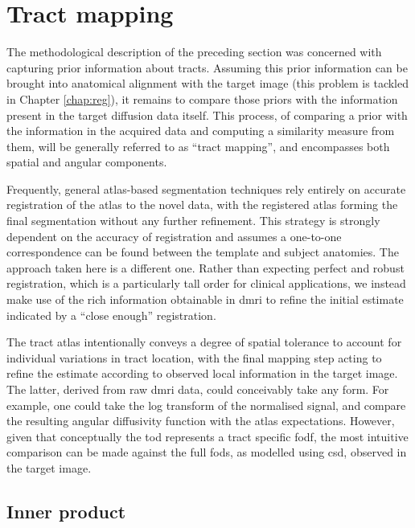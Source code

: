 \section{Tract mapping}
\label{sec:mapping}

The methodological description of the preceding section was concerned with capturing prior information about tracts.
Assuming this prior information can be brought into anatomical alignment with the target image (this problem is tackled in Chapter \ref{chap:reg}), it remains to compare those priors with the information present in the target diffusion data itself.
This process, of comparing a prior with the information in the acquired data and computing a similarity measure from them, will be generally referred to as ``tract mapping'', and encompasses both spatial and angular components.

Frequently, general atlas-based segmentation techniques rely entirely on accurate registration of the atlas to the novel data, with the registered atlas forming the final segmentation without any further refinement.
This strategy is strongly dependent on the accuracy of registration and assumes a one-to-one correspondence can be found between the template and subject anatomies.
The approach taken here is a different one.
Rather than expecting perfect and robust registration, which is a particularly tall order for clinical applications, we instead make use of the rich information obtainable in \gls{dmri} to refine the initial estimate indicated by a ``close enough'' registration.

The tract atlas intentionally conveys a degree of spatial tolerance to account for individual variations in tract location, with the final mapping step acting to refine the estimate according to observed local information in the target image.
The latter, derived from raw \gls{dmri} data, could conceivably take any form.
For example, one could take the log transform of the normalised signal, and compare the resulting angular diffusivity function with the atlas expectations. %
However, given that conceptually the \gls{tod} represents a tract specific \gls{fodf}, the most intuitive comparison can be made against the full \glspl{fod}, as modelled using \gls{csd}, observed in the target image.

\subsection{Inner product}\label{sec:ip}

